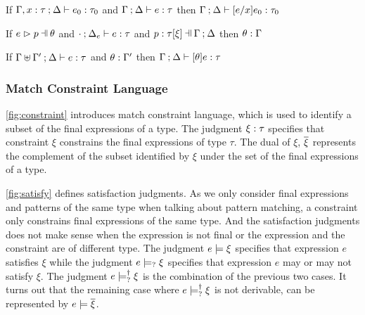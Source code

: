 \begin{lemma}[Substitution]
  \label{lemma:substitution}
  If $\Gamma, x : \tau \mathbin{;} \Delta \vdash e_0 : \tau_0$ and $\Gamma \mathbin{;} \Delta \vdash e : \tau$
  then $\Gamma \mathbin{;} \Delta \vdash [e/x]e_0 : \tau_0$
\end{lemma}

\begin{lemma}
  \label{lemma:subs-typing}
  If $\hpatmatch{e}{p}{\theta}$ and $\cdot \mathbin{;} \Delta_e \vdash e : \tau$ and $\chpattyp{p}{\tau}{\xi}{\Gamma}{\Delta}$
  then $\theta : \Gamma$
\end{lemma}

\begin{lemma}
  \label{lemma:simult-substitution}
  If $\Gamma \uplus \Gamma' \mathbin{;} \Delta \vdash e : \tau$ and $\theta : \Gamma'$
  then $\Gamma \mathbin{;} \Delta \vdash [\theta]e : \tau$
\end{lemma}

\subsubsection{Match Constraint Language}\label{sec:constraint}


\autoref{fig:constraint} introduces match constraint language, which is
used to identify a subset of the final expressions of a type. The judgment
$\xi : \tau$ specifies that constraint $\xi$ constrains the final
expressions of type $\tau$. The dual of $\xi$, $\overline{\xi}$ represents the
complement of the subset identified by $\xi$ under the set of the final
expressions of a type.



\autoref{fig:satisfy} defines satisfaction judgments. As we only
consider final expressions and patterns of the same type when talking about
pattern matching, a constraint only constrains final expressions of the same
type. And the satisfaction judgments does not make sense when the expression is
not final or the expression and the constraint are of different type. The
judgment $e \models \xi$ specifies that expression $e$ satisfies $\xi$ while
the judgment $e \models_{?} \xi$ specifies that expression $e$ may or may not
satisfy $\xi$. The judgment $e \models_{?}^{\dag} \xi$ is the combination of the
previous two cases. It turns out that the remaining case where
$e \models_{?}^{\dag} \xi$ is not derivable, can be represented by
$e \models \overline{\xi}$.


